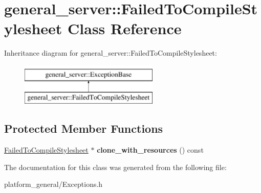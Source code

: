 \hypertarget{classgeneral__server_1_1FailedToCompileStylesheet}{\section{general\-\_\-server\-:\-:\-Failed\-To\-Compile\-Stylesheet \-Class \-Reference}
\label{classgeneral__server_1_1FailedToCompileStylesheet}
}
\-Inheritance diagram for general\-\_\-server\-:\-:\-Failed\-To\-Compile\-Stylesheet\-:\begin{figure}[H]
\begin{center}
\leavevmode
\includegraphics[height=2.000000cm]{classgeneral__server_1_1FailedToCompileStylesheet}
\end{center}
\end{figure}
\subsection*{\-Protected \-Member \-Functions}
\begin{DoxyCompactItemize}
\item 
\hypertarget{classgeneral__server_1_1FailedToCompileStylesheet_a86bba4f3edbf691694da309795ae9244}{\hyperlink{classgeneral__server_1_1FailedToCompileStylesheet}{\-Failed\-To\-Compile\-Stylesheet} $\ast$ {\bfseries clone\-\_\-with\-\_\-resources} () const }\label{classgeneral__server_1_1FailedToCompileStylesheet_a86bba4f3edbf691694da309795ae9244}

\end{DoxyCompactItemize}


\-The documentation for this class was generated from the following file\-:\begin{DoxyCompactItemize}
\item 
platform\-\_\-general/\-Exceptions.\-h\end{DoxyCompactItemize}
